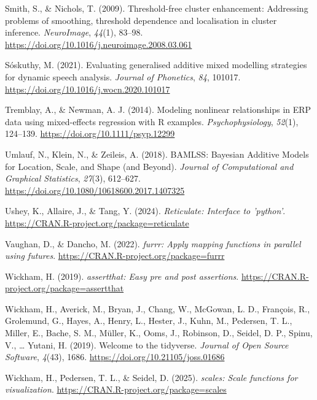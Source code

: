 \documentclass[
  doc,
  floatsintext,
  longtable,
  a4paper,
  nolmodern,
  notxfonts,
  notimes,
  colorlinks=true,linkcolor=blue,citecolor=blue,urlcolor=blue]{apa7}
\newlength{\cslhangindent}
\newenvironment{CSLReferences}[2] %
 {\begin{list}{}{%
  \setlength{\itemindent}{0pt}
  \setlength{\leftmargin}{0pt}
  \setlength{\parsep}{0pt}
  \ifodd #1
   \setlength{\leftmargin}{\cslhangindent}
   \setlength{\itemindent}{-1\cslhangindent}
  \fi
  \setlength{\itemsep}{#2\baselineskip}}}
 {\end{list}}
\begin{document}
\begin{CSLReferences}{1}{0}
Smith, S., \& Nichols, T. (2009). Threshold-free cluster enhancement:
Addressing problems of smoothing, threshold dependence and localisation
in cluster inference. \emph{NeuroImage}, \emph{44}(1), 83--98.
\url{https://doi.org/10.1016/j.neuroimage.2008.03.061}

Sóskuthy, M. (2021). Evaluating generalised additive mixed modelling
strategies for dynamic speech analysis. \emph{Journal of Phonetics},
\emph{84}, 101017. \url{https://doi.org/10.1016/j.wocn.2020.101017}

Tremblay, A., \& Newman, A. J. (2014). Modeling nonlinear relationships
in ERP data using mixed{-}effects regression with R examples.
\emph{Psychophysiology}, \emph{52}(1), 124--139.
\url{https://doi.org/10.1111/psyp.12299}

Umlauf, N., Klein, N., \& Zeileis, A. (2018). BAMLSS: Bayesian Additive
Models for Location, Scale, and Shape (and Beyond). \emph{Journal of
Computational and Graphical Statistics}, \emph{27}(3), 612--627.
\url{https://doi.org/10.1080/10618600.2017.1407325}

Ushey, K., Allaire, J., \& Tang, Y. (2024). \emph{Reticulate: Interface
to 'python'}. \url{https://CRAN.R-project.org/package=reticulate}

Vaughan, D., \& Dancho, M. (2022). \emph{{furrr}: Apply mapping
functions in parallel using futures}.
\url{https://CRAN.R-project.org/package=furrr}

Wickham, H. (2019). \emph{{assertthat}: Easy pre and post assertions}.
\url{https://CRAN.R-project.org/package=assertthat}

Wickham, H., Averick, M., Bryan, J., Chang, W., McGowan, L. D.,
François, R., Grolemund, G., Hayes, A., Henry, L., Hester, J., Kuhn, M.,
Pedersen, T. L., Miller, E., Bache, S. M., Müller, K., Ooms, J.,
Robinson, D., Seidel, D. P., Spinu, V., \ldots{} Yutani, H. (2019).
Welcome to the {tidyverse}. \emph{Journal of Open Source Software},
\emph{4}(43), 1686. \url{https://doi.org/10.21105/joss.01686}

Wickham, H., Pedersen, T. L., \& Seidel, D. (2025). \emph{{scales}:
Scale functions for visualization}.
\url{https://CRAN.R-project.org/package=scales}


\end{CSLReferences}
\end{document}
